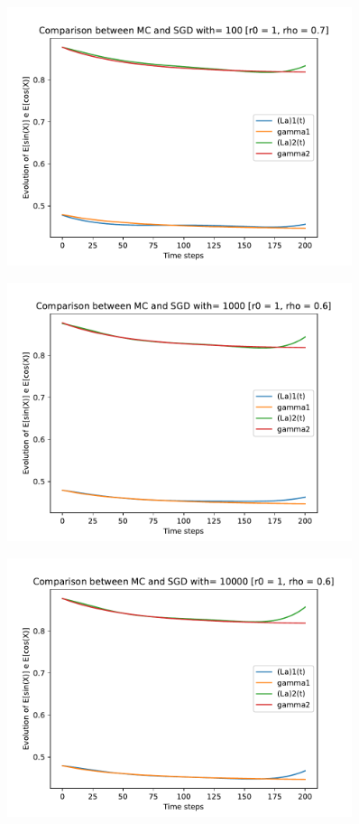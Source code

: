 \documentclass[a4paper,11pt,openright]{report}
\begin{document}
\begin{figure}[H]
\centering
\includegraphics[width=0.9\textwidth]{images/graphs T = 2/n = 5, M = 100 sine and cosine.pdf}
\end{figure}
\begin{figure}[H]
\centering
\includegraphics[width=0.9\textwidth]{images/graphs T = 2/n = 5, M = 1000 sine and cosine.pdf}
\end{figure}
\begin{figure}[H]
\centering
\includegraphics[width=0.9\textwidth]{images/graphs T = 2/n = 5, M = 10000 sine and cosine.pdf}
\end{figure}
\newpage
\end{document}
